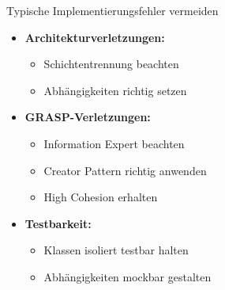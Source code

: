 \begin{KR}{Typische Implementierungsfehler vermeiden}
\begin{itemize}
    \item \textbf{Architekturverletzungen:}
    \begin{itemize}
        \item Schichtentrennung beachten
        \item Abhängigkeiten richtig setzen
    \end{itemize}
    
    \item \textbf{GRASP-Verletzungen:}
    \begin{itemize}
        \item Information Expert beachten
        \item Creator Pattern richtig anwenden
        \item High Cohesion erhalten
    \end{itemize}
    
    \item \textbf{Testbarkeit:}
    \begin{itemize}
        \item Klassen isoliert testbar halten
        \item Abhängigkeiten mockbar gestalten
    \end{itemize}
\end{itemize}
\end{KR}